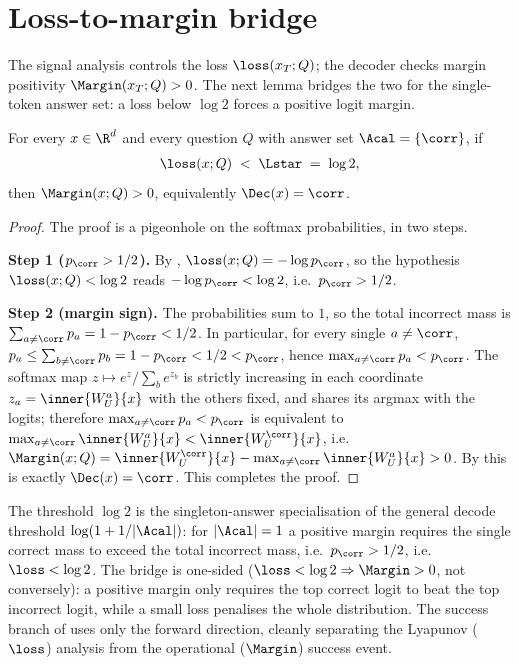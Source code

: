 \section{Loss-to-margin bridge}
\label{sec:loss_to_margin}

The signal analysis controls the loss $\loss(x_T;Q)$; the decoder checks
margin positivity $\Margin(x_T;Q)>0$. The next lemma bridges the two for
the single-token answer set: a loss below $\log 2$ forces a positive
logit margin.

\begin{lemma}
\label{lem:loss_to_margin}
For every $x\in\R^d$ and every question $Q$ with answer set
$\Acal=\{\corr\}$, if
\begin{align}\label{eq:loss_to_margin_hyp}
   \loss(x;Q) \;<\; \Lstar \;=\; \log 2,
\end{align}
then $\Margin(x;Q)>0$, equivalently $\Dec(x)=\corr$.
\end{lemma}

\begin{proof}
The proof is a pigeonhole on the softmax probabilities, in two steps.

\smallskip\noindent\textbf{Step 1 ($p_{\corr}>1/2$).} By ,
$\loss(x;Q)=-\log p_{\corr}$, so the hypothesis $\loss(x;Q)<\log2$ reads
$-\log p_{\corr}<\log2$, i.e.\ $p_{\corr}>1/2$.

\smallskip\noindent\textbf{Step 2 (margin sign).} The probabilities sum to
$1$, so the total incorrect mass is $\sum_{a\neq\corr}p_a=1-p_{\corr}<1/2$.
In particular, for every single $a\neq\corr$,
$p_a\le\sum_{b\neq\corr}p_b=1-p_{\corr}<1/2<p_{\corr}$, hence
$\max_{a\neq\corr}p_a<p_{\corr}$. The softmax map
$z\mapsto e^z/\sum_b e^{z_b}$ is strictly increasing in each coordinate
$z_a=\inner{W_U^a}{x}$ with the others fixed, and shares its argmax with
the logits; therefore $\max_{a\neq\corr}p_a<p_{\corr}$ is equivalent to
$\max_{a\neq\corr}\inner{W_U^a}{x}<\inner{W_U^{\corr}}{x}$, i.e.\
$\Margin(x;Q)=\inner{W_U^{\corr}}{x}-\max_{a\neq\corr}\inner{W_U^a}{x}>0$.
By \Cref{def:decoder} this is exactly $\Dec(x)=\corr$. This completes the
proof.
\end{proof}

\begin{remark}
\label{rem:loss_to_margin_direction}
The threshold $\log 2$ is the singleton-answer specialisation of the
general decode threshold $\log(1+1/|\Acal|)$: for $|\Acal|=1$ a positive
margin requires the single correct mass to exceed the total incorrect
mass, i.e.\ $p_{\corr}>1/2$, i.e.\ $\loss<\log 2$. The bridge is
one-sided ($\loss<\log 2\Rightarrow\Margin>0$, not conversely): a positive
margin only requires the top correct logit to beat the top incorrect
logit, while a small loss penalises the whole distribution. The success
branch of \Cref{thm:R1} uses only the forward direction, cleanly
separating the Lyapunov ($\loss$) analysis from the operational
($\Margin$) success event.
\end{remark}
